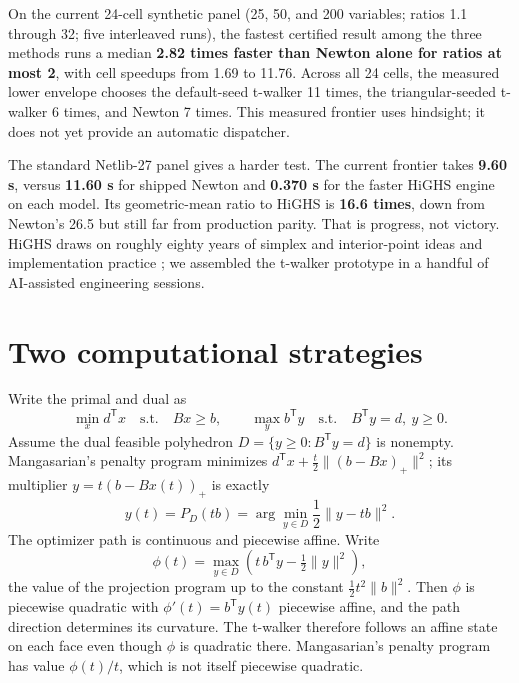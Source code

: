 \documentclass[11pt]{article}
\begin{document}
On the current 24-cell synthetic panel (25, 50, and 200 variables; ratios 1.1 through 32; five interleaved runs), the fastest certified result among the three methods runs a median \textbf{2.82 times faster than Newton alone for ratios at most 2}, with cell speedups from 1.69 to 11.76. Across all 24 cells, the measured lower envelope chooses the default-seed t-walker 11 times, the triangular-seeded t-walker 6 times, and Newton 7 times. This measured frontier uses hindsight; it does not yet provide an automatic dispatcher.

The standard Netlib-27 panel gives a harder test. The current frontier takes \textbf{9.60 s}, versus \textbf{11.60 s} for shipped Newton and \textbf{0.370 s} for the faster HiGHS engine on each model. Its geometric-mean ratio to HiGHS is \textbf{16.6 times}, down from Newton's 26.5 but still far from production parity. That is progress, not victory. HiGHS draws on roughly eighty years of simplex and interior-point ideas and implementation practice \citep{huangfu-hall-2018}; we assembled the t-walker prototype in a handful of AI-assisted engineering sessions.

\section{Two computational strategies}

Write the primal and dual as
\[
  \min_x d^\mathsf{T}x \quad\text{s.t.}\quad Bx\ge b,
  \qquad
  \max_y b^\mathsf{T}y \quad\text{s.t.}\quad B^\mathsf{T}y=d,\ y\ge0.
\]
Assume the dual feasible polyhedron $D=\{y\ge0:B^\mathsf{T}y=d\}$ is nonempty. Mangasarian's penalty program minimizes $d^\mathsf{T}x+\frac{t}{2}\lVert(b-Bx)_+\rVert^2$; its multiplier $y=t(b-Bx(t))_+$ is exactly
\[
  y(t)=P_D(tb)=\arg\min_{y\in D}\frac12\lVert y-tb\rVert^2.
\]
The optimizer path is continuous and piecewise affine. Write
\[
  \phi(t)=\max_{y\in D}\left(t\,b^\mathsf{T}y-\tfrac12\lVert y\rVert^2\right),
\]
the value of the projection program up to the constant $\tfrac12 t^2\lVert b\rVert^2$. Then $\phi$ is piecewise quadratic with $\phi'(t)=b^\mathsf{T}y(t)$ piecewise affine, and the path direction determines its curvature. The t-walker therefore follows an affine state on each face even though $\phi$ is quadratic there. Mangasarian's penalty program has value $\phi(t)/t$, which is not itself piecewise quadratic.
\end{document}
